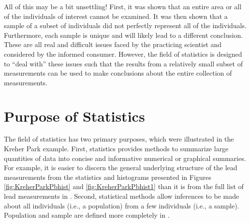 \documentclass[10pt,openany]{book}\usepackage[]{graphicx}\usepackage[]{color}
\begin{document}

\vspace{-12pt}

All of this may be a bit unsettling!  First, it was shown that an entire area or all of the individuals of interest cannot be examined.  It was then shown that a sample of a subset of individuals did not perfectly represent all of the individuals.  Furthermore, each sample is unique and will likely lead to a different conclusion.  These are all real and difficult issues faced by the practicing scientist and considered by the informed consumer.  However, the field of statistics is designed to ``deal with'' these issues such that the results from a relatively small subset of measurements can be used to make conclusions about the entire collection of measurements.



\section{Purpose of Statistics}
The field of statistics has two primary purposes, which were illustrated in the Kreher Park example.  First, statistics provides methods to summarize large quantities of data into concise and informative numerical or graphical summaries.  For example, it is easier to discern the general underlying structure of the lead measurements from the statistics and histograms presented in Figures \ref{fig:KreherParkPbhist} and \ref{fig:KreherParkPbhist1} than it is from the full list of lead measurements in .  Second, statistical methods allow inferences to be made about all individuals (i.e., a population) from a few individuals (i.e., a sample).  Population and sample are defined more completely in .

\end{document}

